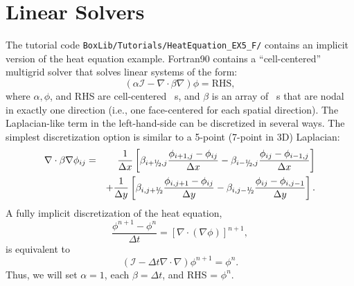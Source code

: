 \section{Linear Solvers}\label{Sec:Linear Solvers}
The tutorial code {\tt BoxLib/Tutorials/HeatEquation\_EX5\_F/} contains an implicit version of the heat equation 
example.  Fortran90 \BoxLib contains a ``cell-centered'' multigrid solver that solves linear systems of the form:
\begin{equation}
(\alpha\mathcal{I} - \nabla\cdot\beta\nabla)\phi = \text{RHS},
\end{equation}
where $\alpha, \phi$, and RHS are cell-centered \MultiFab~s, and $\beta$ is an array of \MultiFab~s that 
are nodal in exactly one direction (i.e., one face-centered \MultiFab for each spatial direction).
The Laplacian-like term in the left-hand-side can be discretized in several ways.  The simplest discretization
option is similar to a 5-point (7-point in 3D) Laplacian:
\begin{eqnarray}
\nabla\cdot\beta\nabla\phi_{ij} &=&
\frac{1}{\Delta x} \left[\beta_{i+\myhalf,j}\frac{\phi_{i+1,j} - \phi_{ij}}{\Delta x} - \beta_{i-\myhalf,j}\frac{\phi_{ij} - \phi_{i-1,j}}{\Delta x}\right]\nonumber\\
&&+ \frac{1}{\Delta y} \left[\beta_{i,j+\myhalf}\frac{\phi_{i,j+1} - \phi_{ij}}{\Delta y} - \beta_{i,j-\myhalf}\frac{\phi_{ij} - \phi_{i,j-1}}{\Delta y}\right].
\end{eqnarray}
A fully implicit discretization of the heat equation,
\begin{equation}
\frac{\phi^{n+1} - \phi^n}{\Delta t} = \left[\nabla\cdot(\nabla\phi)\right]^{n+1},
\end{equation}
is equivalent to
\begin{equation}
(\mathcal{I} - \Delta t\nabla\cdot\nabla)\phi^{n+1} = \phi^n.
\end{equation}
Thus, we will set $\alpha=1$, each $\beta=\Delta t$, and RHS = $\phi^n$.
